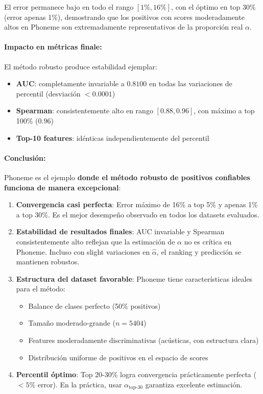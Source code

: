 \documentclass[a4paper,11pt]{article}
\begin{document}
El error permanece bajo en todo el rango $[1\%, 16\%]$, con el óptimo en top 30\% (error apenas 1\%), demostrando que los positivos con scores moderadamente altos en Phoneme son extremadamente representativos de la proporción real $\alpha$.

\paragraph{Impacto en métricas finale:} El método robusto produce estabilidad ejemplar:

\begin{itemize}
    \item \textbf{AUC}: completamente invariable a $0.8100$ en todas las variaciones de percentil (desviación $< 0.0001$)
    \item \textbf{Spearman}: consistentemente alto en rango $[0.88, 0.96]$, con máximo a top 100\% ($0.96$)
    \item \textbf{Top-10 features}: idénticas independientemente del percentil
\end{itemize}

\paragraph{Conclusión:} Phoneme es el ejemplo \textbf{donde el método robusto de positivos confiables funciona de manera excepcional}:

\begin{enumerate}
    \item \textbf{Convergencia casi perfecta}: Error máximo de 16\% a top 5\% y apenas 1\% a top 30\%. Es el mejor desempeño observado en todos los datasets evaluados.
    \item \textbf{Estabilidad de resultados finales}: AUC invariable y Spearman consistentemente alto reflejan que la estimación de $\alpha$ no es crítica en Phoneme. Incluso con slight variaciones en $\hat{\alpha}$, el ranking y predicción se mantienen robustos.
    \item \textbf{Estructura del dataset favorable}: Phoneme tiene características ideales para el método:
    \begin{itemize}
        \item Balance de clases perfecto (50\% positivos)
        \item Tamaño moderado-grande ($n=5404$)
        \item Features moderadamente discriminativas (acústicas, con estructura clara)
        \item Distribución uniforme de positivos en el espacio de scores
    \end{itemize}
    \item \textbf{Percentil óptimo}: Top 20-30\% logra convergencia prácticamente perfecta ($< 5\%$ error). En la práctica, usar $\alpha_{\text{top-30}}$ garantiza excelente estimación.
\end{enumerate}
\end{document}
